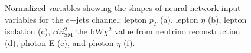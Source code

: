 \begin{figure}[h!]
\vspace{-4.5mm}
\hfil
{}
\caption{Normalized variables showing the shapes of neural network input variables for the $e$+jets channel: lepton $p_T$ (a), lepton $\eta$ (b), lepton isolation (c), $chi^2_{\text{SM}}$ the bW$\chi^2$ value from neutrino reconstruction (d), photon E (e), and photon $\eta$ (f).}
\label{fig:VarPlotsej5}
\end{figure}

